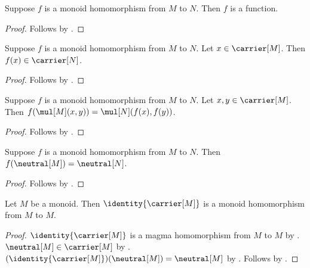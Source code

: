 \begin{corollary}\label{monoid_hom_is_function}
    Suppose $f$ is a monoid homomorphism from $M$ to $N$.
    Then $f$ is a function.
\end{corollary}
\begin{proof}
    Follows by .
\end{proof}

\begin{corollary}\label{monoid_hom_apply_type}
    Suppose $f$ is a monoid homomorphism from $M$ to $N$.
    Let $x\in\carrier[M]$.
    Then $f(x)\in\carrier[N]$.
\end{corollary}
\begin{proof}
    Follows by .
\end{proof}

\begin{proposition}\label{monoid_hom_mul}
    Suppose $f$ is a monoid homomorphism from $M$ to $N$.
    Let $x,y\in\carrier[M]$.
    Then $f(\mul[M](x,y))=\mul[N](f(x),f(y))$.
\end{proposition}
\begin{proof}
    Follows by
        .
\end{proof}

\begin{proposition}\label{monoid_hom_neutral}
    Suppose $f$ is a monoid homomorphism from $M$ to $N$.
    Then $f(\neutral[M])=\neutral[N]$.
\end{proposition}
\begin{proof}
    Follows by .
\end{proof}

\begin{proposition}\label{identity_monoid_hom}
    Let $M$ be a monoid.
    Then $\identity{\carrier[M]}$ is a monoid homomorphism from $M$ to $M$.
\end{proposition}
\begin{proof}
    $\identity{\carrier[M]}$ is a magma homomorphism from $M$ to $M$ by
        .
    $\neutral[M]\in\carrier[M]$ by
        .
    $(\identity{\carrier[M]})(\neutral[M])=\neutral[M]$ by
        .
    Follows by .
\end{proof}

